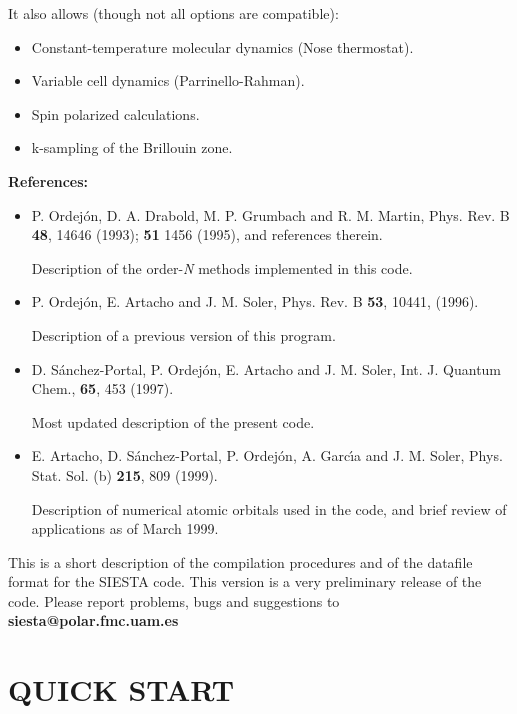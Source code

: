 It also allows (though not all options are compatible):
\begin{itemize}
\item Constant-temperature molecular dynamics (Nose thermostat).
\item Variable cell dynamics (Parrinello-Rahman).
\item Spin polarized calculations.
\item k-sampling of the Brillouin zone.
\end{itemize}

{\large {\bf References:} }

\begin{itemize}

\item
P. Ordej\'on, D. A. Drabold, M. P. Grumbach and R. M. Martin, 
Phys. Rev. B {\bf 48}, 14646 (1993); {\bf 51} 1456 (1995),
and references therein.

Description of the order-{\it N}
methods implemented in this code.

\item
P. Ordej\'on, E. Artacho and J. M. Soler,
Phys. Rev. B {\bf 53}, 10441, (1996).

Description of a previous version of this program.

\item
D. S\'anchez-Portal, P. Ordej\'on, E. Artacho and J. M. Soler,
Int. J. Quantum Chem., {\bf 65}, 453 (1997).

Most updated description of the present code.

\item
E. Artacho, D. S\'anchez-Portal, P. Ordej\'on, A. Garc\'{\i}a and
J. M. Soler, Phys. Stat. Sol. (b) {\bf 215}, 809 (1999).

Description of numerical atomic orbitals used in the code,
and brief review of applications as of March 1999.

\end{itemize}

This is a short description of the compilation procedures
and of the datafile format for the SIESTA code.
This version is a very preliminary release of the code.
Please report problems, bugs and suggestions to
{\bf siesta@polar.fmc.uam.es}



\section{QUICK START}

